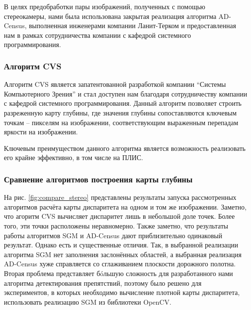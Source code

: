 \documentclass[aps,%
14pt,%
final,%
oneside,
onecolumn,%
musixtex, %
superscriptaddress,%
centertags]{extarticle} %
\begin{document}
В целях предобработки пары изображений, полученных с помощью стереокамеры, нами была использована закрытая реализация алгоритма AD-Census, выполненная инженерами компании Ланит-Терком\cite{tercom} и предоставленная нам в рамках сотрудничества компании с кафедрой системного программирования.


\subsubsection{Алгоритм CVS}
Алгоритм CVS\cite{cvs} является запатентованной разработкой компании ``Системы Компьютерного Зрения''\cite{cvs_webpage} и стал доступен нам благодаря сотрудничеству компании с кафедрой системного программирования. Данный алгоритм позволяет строить разреженную карту глубины, где значения глубины сопоставляются ключевым точкам -- пикселям на изображении, соответствующим выраженным перепадам яркости на изображении.

Ключевым преимуществом данного алгоритма является возможность реализовать его крайне эффективно, в том числе на ПЛИС\cite{cvs}.

\subsubsection{Сравнение алгоритмов построения карты глубины}

На рис. \ref{fig:compare_stereo} представлены результаты запуска рассмотренных алгоритмов расчёта карты диспаритета на одном и том же изображении. Заметно, что агоритм CVS вычисляет диспаритет лишь в небольшой доле точек. Более того, эти точки расположены неравномерно. Также заметно, что результаты работы алгоритмов SGM и AD-Census дают приблизительно одинаковый результат. Однако есть и существенные отличия. Так, в выбранной реализации алгоритма SGM нет заполнения заслонённых областей, а выбранная реализация AD-Census хуже справляется со сглаживанием плоскости дорожного полотна. Вторая проблема представляет б\'oльшую сложность для разработанного нами алгоритма детектирования препятствий, поэтому было решено для экспериментов, в которых необходимо вычисление плотной карты диспаритета, использовать реализацию SGM из библиотеки OpenCV.
\end{document}
